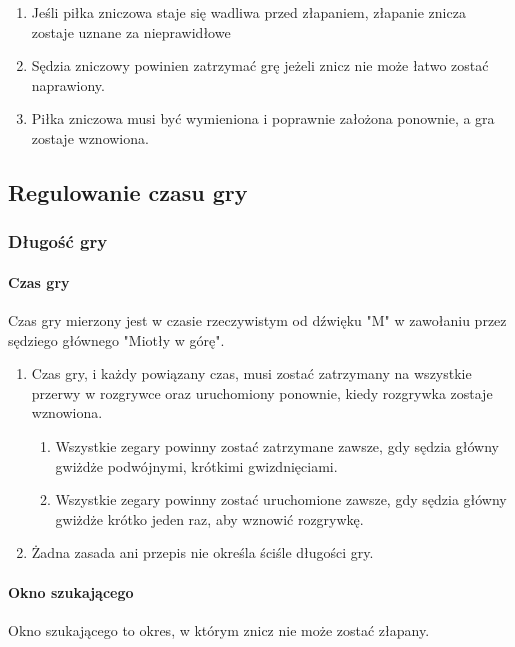 \documentclass[12pt]{article}
\begin{document}
\begin{enumerate}
\begin{enumerate}
		      \item Jeśli piłka zniczowa staje się wadliwa przed złapaniem, złapanie
		            znicza zostaje uznane za nieprawidłowe

		      \item Sędzia zniczowy powinien zatrzymać grę jeżeli znicz nie może łatwo
		            zostać naprawiony.

		      \item Piłka zniczowa musi być wymieniona i poprawnie założona ponownie, a
		            gra zostaje wznowiona.
	      \end{enumerate}
\end{enumerate}

\subsection{Regulowanie czasu gry}

\subsubsection{Długość gry}

\paragraph{Czas gry}
Czas gry mierzony jest w czasie
rzeczywistym od dźwięku "M" w zawołaniu przez sędziego głównego "Miotły
w górę".

\begin{enumerate}
	\item Czas gry, i każdy powiązany czas, musi zostać zatrzymany na wszystkie
	      przerwy w rozgrywce oraz uruchomiony ponownie, kiedy rozgrywka zostaje
	      wznowiona.
	      \begin{enumerate}
		      \item Wszystkie zegary powinny zostać zatrzymane zawsze, gdy sędzia główny
		            gwiżdże podwójnymi, krótkimi gwizdnięciami.

		      \item Wszystkie zegary powinny zostać uruchomione zawsze, gdy sędzia
		            główny gwiżdże krótko jeden raz, aby wznowić rozgrywkę.
	      \end{enumerate}

	\item Żadna zasada ani przepis nie określa ściśle długości gry.
\end{enumerate}

\paragraph{Okno szukającego}
Okno szukającego to okres, w którym
znicz nie może zostać złapany.
\end{document}
